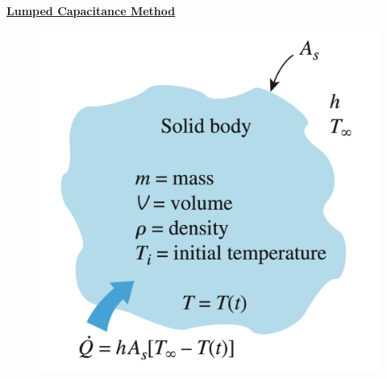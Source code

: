 \textbf{\underline{Lumped Capacitance Method}}
\begin{figure}[H]
    \centering
    \includegraphics[width=0.55\linewidth]{images/lumped_system_analysis.png}
\end{figure}
